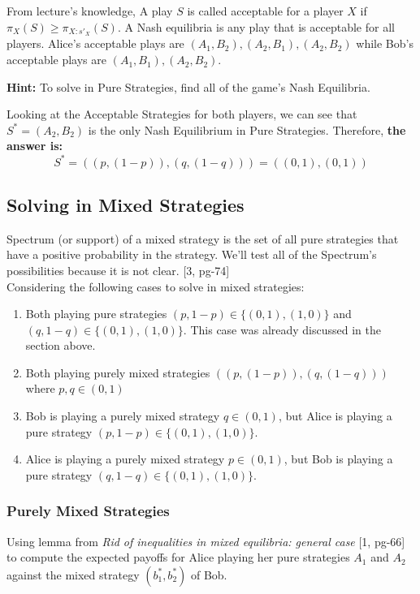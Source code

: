 \documentclass{article}
\begin{document}
From lecture's knowledge, A play $S$ is called acceptable for a player $X$ if $\pi_X(S) \geq \pi_{X:s'_X}(S)$. A Nash equilibria is any play that is acceptable for all players. Alice's acceptable plays are $(A_1, B_2), (A_2, B_1), (A_2, B_2)$ while Bob's acceptable plays are $(A_1, B_1), (A_2, B_2)$.

\textbf{Hint:} To solve in Pure Strategies, find all of the game's Nash Equilibria.



Looking at the Acceptable Strategies for both players, we can see that $S^* = (A_2, B_2)$ is the only Nash Equilibrium in Pure Strategies. 
Therefore, \textbf{the answer is:}
$$
S^* = ((p, (1 - p)), (q, (1 - q))) = ((0, 1), (0, 1))
$$
\subsection{Solving in Mixed Strategies}
Spectrum (or support) of a mixed strategy is the set of all pure strategies that have a positive probability in the
strategy. We'll test all of the Spectrum's possibilities because it is not clear. [3, pg-74] \\

Considering the following cases to solve in mixed strategies:
\begin{enumerate}
    \item Both playing pure strategies 
    $(p, 1 - p) \in \{(0, 1), (1, 0)\}$ and $(q, 1 - q) \in \{(0, 1), (1, 0)\}$. This case was already discussed in the section above.
    \item Both playing purely mixed strategies $((p, (1 - p)), (q, (1 - q)))$ where $p, q \in (0, 1)$
    \item Bob is playing a purely mixed strategy $q \in (0, 1)$, but Alice is playing a pure strategy $(p, 1 - p) \in \{(0, 1), (1, 0)\}$.
    
    \item Alice is playing a purely mixed strategy $p \in (0, 1)$, but Bob is playing a pure strategy $(q, 1 - q) \in \{(0, 1), (1, 0)\}$.
\end{enumerate}
\subsubsection{Purely Mixed Strategies}
Using lemma from \textit{Rid of inequalities in mixed equilibria:
general case} [1, pg-66]
to compute the expected payoffs for Alice playing her pure strategies $A_1$ and $A_2$ against the mixed
strategy $(b^*_1 , b^*_2)$ of Bob. \\
\end{document}
